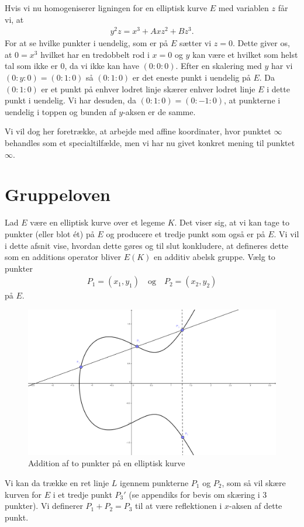 Hvis vi nu homogeniserer ligningen for en elliptisk kurve $E$ med variablen $z$ får vi, at
\begin{align*}
\label{homogeniseret_weierstrass}
	y^2 z = x^3 + Ax z^2 + B z^3.
\end{align*} 
For at se hvilke punkter i uendelig, som er på $E$ sætter vi $z=0$. Dette giver os, at $0 = x^3$ hvilket har en tredobbelt rod i $x=0$ og $y$ kan være et hvilket som helst tal som ikke er $0$, da vi ikke kan have $(0 : 0 : 0)$. 
Efter en skalering med $y$ har vi $(0 : y : 0) = (0 : 1 : 0)$ så $(0 : 1 : 0)$ er det eneste punkt i uendelig på $E$. Da $(0 : 1 : 0)$ er et punkt på enhver lodret linje skærer enhver lodret linje $E$ i dette punkt i uendelig. Vi har desuden, da $(0 : 1 : 0) = (0 : -1 : 0)$, at punkterne i uendelig i toppen og bunden af $y$-aksen er de samme.

Vi vil dog her foretrække, at arbejde med affine koordinater, hvor punktet $\infty$ behandles som et specialtilfælde, men vi har nu givet konkret mening til punktet $\infty$.

\section{Gruppeloven}
Lad $E$ være en elliptisk kurve over et legeme $K$. Det viser sig, at vi kan tage to punkter (eller blot ét) på $E$ og producere et tredje punkt som også er på $E$. Vi vil i dette afsnit vise, hvordan dette gøres og til slut konkludere, at defineres dette som en additions operator bliver $E(K)$ en additiv abelsk gruppe. Vælg to punkter
\begin{align*}
	P_1 = (x_1, y_1) \quad \text{og} \quad P_2 = (x_2, y_2)
\end{align*}
på $E$. 
\begin{figure}
\label{figure_addition_law}
\centering
\includegraphics[scale=0.25]{elliptic_1_better}
\caption{Addition af to punkter på en elliptisk kurve}
\end{figure}
Vi kan da trække en ret linje $L$ igennem punkterne $P_1$ og $P_2$, som så vil skære kurven for $E$ i et tredje punkt ${P_3}'$ (se appendiks for bevis om skæring i 3 punkter). Vi definerer $P_1 + P_2 = P_3$ til at være reflektionen i $x$-aksen af dette punkt. 

